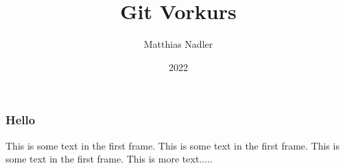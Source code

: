 \documentclass{beamer}
\title{Git Vorkurs}
\author{Matthias Nadler}
\institute{Uni Basel}
\date{2022}
\begin{document}
\frame{\titlepage}

\begin{frame}
\frametitle{Hello}
This is some text in the first frame. This is some text in the first frame. This is some text in the first frame.
This is more text.....
\end{frame}
\end{document}
